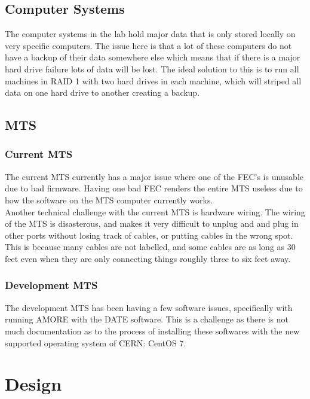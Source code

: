 \documentclass[12pt]{article}
\newcommand\tab[1][1cm]{\hspace*{#1}}
\begin{document}
\subsection{Computer Systems}
\tab The computer systems in the lab hold major data that is only stored locally on very specific computers. The issue here is that a lot of these computers do not have a backup of their data somewhere else which means that if there is a major hard drive failure lots of data will be lost. The ideal solution to this is to run all machines in RAID 1 with two hard drives in each machine, which will striped all data on one hard drive to another creating a backup. 
\subsection{MTS}
\subsubsection{Current MTS}
\tab The current MTS currently has a major issue where one of the FEC's is unusable due to bad firmware. Having one bad FEC renders the entire MTS useless due to how the software on the MTS computer currently works. \\
\tab Another technical challenge with the current MTS is hardware wiring. The wiring of the MTS is disasterous, and makes it very difficult to unplug and and plug in other ports without losing track of cables, or putting cables in the wrong spot. This is because many cables are not labelled, and some cables are as long as 30 feet even when they are only connecting things roughly three to six feet away.
\subsubsection{Development MTS}
\tab The development MTS has been having a few software issues, specifically with running AMORE with the DATE software. This is a challenge as there is not much documentation as to the process of installing these softwares with the new supported operating system of CERN: CentOS 7.
 
\section{Design}
\end{document}
